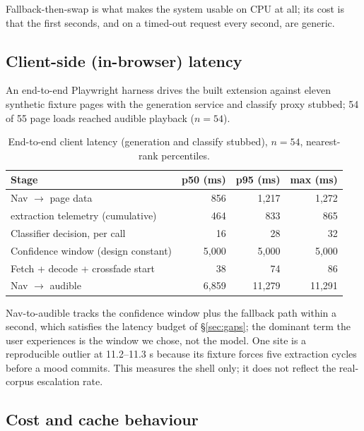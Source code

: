 \documentclass[conference]{IEEEtran}
\let\IEEEoriginalcaption\caption
\renewcommand{\caption}[1]{\IEEEoriginalcaption{\footnotesize #1}}
\begin{document}
Fallback-then-swap is what makes the system usable on CPU at all; its
cost is that the first seconds, and on a timed-out request every second,
are generic.

\subsection{Client-side (in-browser) latency}
\label{sec:res-e2e-latency}

An end-to-end Playwright harness drives the built extension against
eleven synthetic fixture pages with the generation service and classify
proxy stubbed; 54 of 55 page loads reached audible playback ($n=54$).

\begin{table}[t]
\caption{End-to-end client latency (generation and classify stubbed),
$n=54$, nearest-rank percentiles.}
\label{tab:e2e-latency}
\begin{center}
\scriptsize
\begin{tabular}{p{3.3cm}rrr}
\toprule
\textbf{Stage} & \textbf{p50 (ms)} & \textbf{p95 (ms)} & \textbf{max (ms)} \\
\midrule
Nav $\to$ page data & 856 & 1{,}217 & 1{,}272 \\
\quad extraction telemetry (cumulative) & 464 & 833 & 865 \\
Classifier decision, per call & 16 & 28 & 32 \\
Confidence window (design constant) & 5{,}000 & 5{,}000 & 5{,}000 \\
Fetch + decode + crossfade start & 38 & 74 & 86 \\
\midrule
Nav $\to$ audible & 6{,}859 & 11{,}279 & 11{,}291 \\
\bottomrule
\end{tabular}
\end{center}
\end{table}

Nav-to-audible tracks the confidence window plus the fallback path within
a second, which satisfies the latency budget of \S\ref{sec:gaps}; the
dominant term the user experiences is the window we chose, not the model.
One site is a reproducible outlier at 11.2--11.3 s because its fixture
forces five extraction cycles before a mood commits. This measures the
shell only; it does not reflect the real-corpus escalation rate.

\subsection{Cost and cache behaviour}
\label{sec:res-cost}
\end{document}
